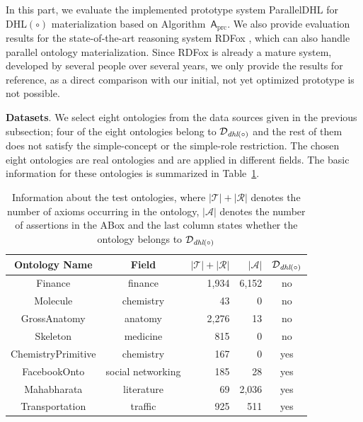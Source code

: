In this part, we evaluate the implemented prototype system ParallelDHL
for DHL$(\circ)$ materialization based on
Algorithm~$\mathsf{A}_{\text{prc}}$. We also provide evaluation
results for the state-of-the-art reasoning system RDFox
\cite{MotikNPHO14}, which can also handle parallel ontology
materialization. Since RDFox is already a mature system, developed by
several people over several years, we only provide the results for
reference, as a direct comparison with our initial, not yet optimized
prototype is not possible.

\textbf{Datasets}.
We select eight ontologies from the data sources given in the previous subsection;
four of the eight ontologies belong to $\mathcal{D}_{\textit{\text{dhl}}(\circ)}$ and
the rest of them does not satisfy the simple-concept or the simple-role
restriction.
The chosen eight ontologies are real ontologies and are applied in different fields.
The basic information for these ontologies
is summarized in Table~\ref{tab:info}.

\begin{table}[htb]
\centering
\caption{Information about the test ontologies, where
  $|\mathcal{T}|+|\mathcal{R}|$ denotes the number of axioms occurring
  in the ontology, $|\mathcal{A}|$ denotes the number of assertions
  in the ABox and the last column states whether the
  ontology belongs to $\mathcal{D}_{\textit{\text{dhl}}(\circ)}$}
\begin{tabular}{>{\hspace*{5mm}}ccrrc<{\hspace*{5mm}}}
\hline
\textbf{Ontology Name} & \textbf{Field} &
                                          $|\mathcal{T}|+|\mathcal{R}|$
  & $|\mathcal{A}|$ & $\mathcal{D}_{\textit{\text{dhl}}(\circ)}$\\
\hline

Finance&finance&1,934&6,152&no\\

Molecule&chemistry&43&0&no\\

GrossAnatomy&anatomy&2,276&13&no\\

Skeleton&medicine&815&0&no\\

\hline

ChemistryPrimitive&chemistry&167&0& yes\\

FacebookOnto&social networking&185&28& yes\\

Mahabharata&literature&69&2,036& yes\\

Transportation&traffic&925&511& yes\\

\hline
\end{tabular}
\label{tab:info}
\end{table}

